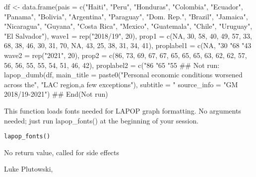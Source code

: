\documentclass[a4paper]{book}
\begin{document}
\begin{Examples}
\begin{ExampleCode}

df <- data.frame(pais = c("Haiti", "Peru", "Honduras", "Colombia", "Ecuador",
                          "Panama", "Bolivia", "Argentina", "Paraguay",
                          "Dom. Rep.", "Brazil", "Jamaica", "Nicaragua",
                          "Guyana", "Costa Rica", "Mexico", "Guatemala",
                          "Chile", "Uruguay", "El Salvador"),
                 wave1 = rep("2018/19", 20),
                 prop1 = c(NA, 30, 58, 40, 49, 57, 33, 68, 38, 46, 30,
                           31, 70, NA, 43, 25, 38, 31, 34, 41),
                 proplabel1 = c(NA, "30%
                                "68%
                                "43%
                 wave2 = rep("2021", 20),
                 prop2 = c(86, 73, 69, 67, 67, 65, 65, 65, 63, 62, 62,
                           57, 56, 56, 55, 55, 54, 51, 46, 42),
                 proplabel2 = c("86%
                                "65%
                                "55%
## Not run: 
lapop_dumb(df,
         main_title = paste0("Personal economic conditions worsened across the",
                             "LAC region,\nwith a few exceptions"),
         subtitle = "%
         source_info = "GM 2018/19-2021")
## End(Not run)

\end{ExampleCode}
\end{Examples}
%
\begin{Description}
This function loads fonts needed for LAPOP graph formatting.
No arguments needed; just run lapop\_fonts() at the beginning of your session.
\end{Description}
%
\begin{Usage}
\begin{verbatim}
lapop_fonts()
\end{verbatim}
\end{Usage}
%
\begin{Value}
No return value, called for side effects
\end{Value}
%
\begin{Author}
Luke Plutowski, 
\end{Author}
\end{document}
